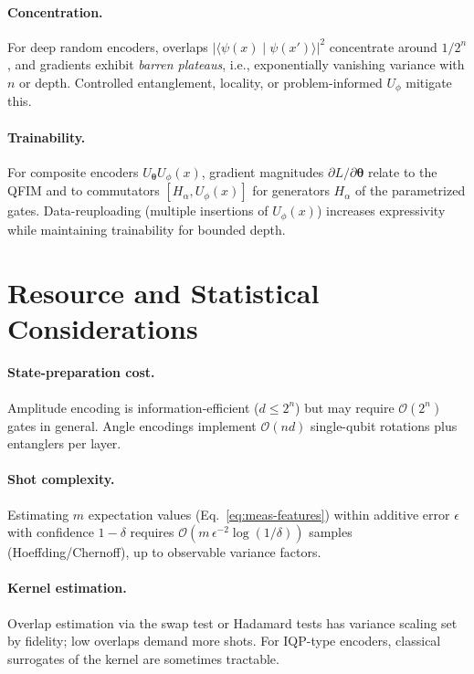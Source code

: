 \documentclass[11pt]{article}
\begin{document}
\paragraph{Concentration.} For deep random encoders, overlaps \(\lvert\langle \psi(x)\mid\psi(x')\rangle\rvert^2\) concentrate around \(1/2^n\), and gradients exhibit \emph{barren plateaus}, i.e., exponentially vanishing variance with \(n\) or depth. Controlled entanglement, locality, or problem-informed \(U_\phi\) mitigate this.

\paragraph{Trainability.} For composite encoders \(U_{\bm{\theta}} U_\phi(x)\), gradient magnitudes \(\partial L/\partial \bm{\theta}\) relate to the QFIM and to commutators \([H_\alpha, U_\phi(x)]\) for generators \(H_\alpha\) of the parametrized gates. Data-reuploading (multiple insertions of \(U_\phi(x)\)) increases expressivity while maintaining trainability for bounded depth.

\section{Resource and Statistical Considerations}

\paragraph{State-preparation cost.} Amplitude encoding is information-efficient (\(d\le 2^n\)) but may require \(\mathcal{O}(2^n)\) gates in general. Angle encodings implement \(\mathcal{O}(nd)\) single-qubit rotations plus entanglers per layer.

\paragraph{Shot complexity.} Estimating \(m\) expectation values (Eq.~\eqref{eq:meas-features}) within additive error \(\epsilon\) with confidence \(1-\delta\) requires \(\mathcal{O}(m\,\epsilon^{-2}\log(1/\delta))\) samples (Hoeffding/Chernoff), up to observable variance factors.

\paragraph{Kernel estimation.} Overlap estimation via the swap test or Hadamard tests has variance scaling set by fidelity; low overlaps demand more shots. For IQP-type encoders, classical surrogates of the kernel are sometimes tractable.
\end{document}

